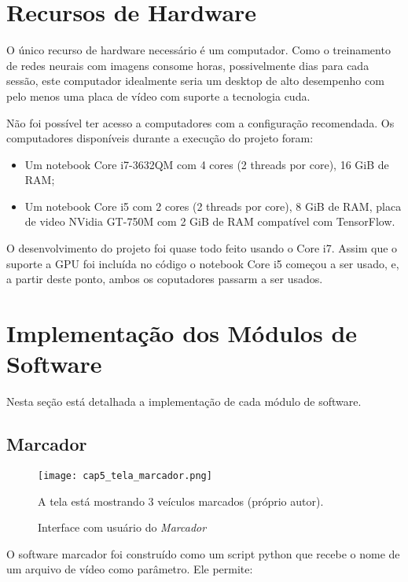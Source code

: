 \section{Recursos de Hardware}

O único recurso de hardware necessário é um computador. Como o treinamento de
redes neurais com imagens consome horas, possivelmente dias para cada sessão,
este computador idealmente seria um desktop de alto desempenho com pelo menos
uma placa de vídeo com suporte a tecnologia cuda.

Não foi possível ter acesso a computadores com a configuração recomendada.
Os computadores disponíveis durante a execução do projeto foram:

\begin{itemize}
\item Um notebook Core i7-3632QM com 4 cores (2 threads por core), 16 GiB
	de RAM;
\item Um notebook Core i5 com 2 cores (2 threads por core), 8 GiB de RAM,
	placa de video NVidia GT-750M com 2 GiB de RAM compatível com TensorFlow.
\end{itemize}

O desenvolvimento do projeto foi quase todo feito usando o Core i7. Assim que
o suporte a GPU foi incluída no código o notebook Core i5 começou a ser usado,
e, a partir deste ponto, ambos os coputadores passarm a ser usados.

\section{Implementação dos Módulos de Software}

Nesta seção está detalhada a implementação de cada módulo de software.

\subsection{Marcador}

\begin{figure}[!htb]
	\centering
	\texttt{[image: cap5\_tela\_marcador.png]}
	\caption{Interface com usuário do \emph{Marcador}}
	\label{fig:cap5_tela_marcador}
	A tela está mostrando 3 veículos marcados (próprio autor).
\end{figure}

O software marcador foi construído como um script python que recebe o nome de
um arquivo de vídeo como parâmetro. Ele permite:

